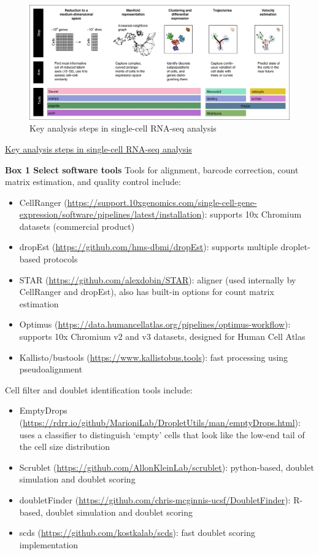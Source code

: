 \documentclass[
]{book}
\begin{document}
\begin{figure}
\centering
\includegraphics{./figs/singleCell/key_analysis_review2.jpg}
\caption{Key analysis steps in single-cell RNA-seq analysis}
\end{figure}

\href{https://www.nature.com/articles/s41592-021-01171-x/figures/2}{Key analysis steps in single-cell RNA-seq analysis}

\textbf{Box 1 Select software tools}
Tools for alignment, barcode correction, count matrix estimation, and quality control include:

\begin{itemize}
\item
  CellRanger (\url{https://support.10xgenomics.com/single-cell-gene-expression/software/pipelines/latest/installation}): supports 10x Chromium datasets (commercial product)
\item
  dropEst (\url{https://github.com/hms-dbmi/dropEst}): supports multiple droplet-based protocols
\item
  STAR (\url{https://github.com/alexdobin/STAR}): aligner (used internally by CellRanger and dropEst), also has built-in options for count matrix estimation
\item
  Optimus (\url{https://data.humancellatlas.org/pipelines/optimus-workflow}): supports 10x Chromium v2 and v3 datasets, designed for Human Cell Atlas
\item
  Kallisto/bustools (\url{https://www.kallistobus.tools}): fast processing using pseudoalignment
\end{itemize}

Cell filter and doublet identification tools include:

\begin{itemize}
\item
  EmptyDrops (\url{https://rdrr.io/github/MarioniLab/DropletUtils/man/emptyDrops.html}): uses a classifier to distinguish `empty' cells that look like the low-end tail of the cell size distribution
\item
  Scrublet (\url{https://github.com/AllonKleinLab/scrublet}): python-based, doublet simulation and doublet scoring
\item
  doubletFinder (\url{https://github.com/chris-mcginnis-ucsf/DoubletFinder}): R-based, doublet simulation and doublet scoring
\item
  scds (\url{https://github.com/kostkalab/scds}): fast doublet scoring implementation
\end{itemize}
\end{document}
